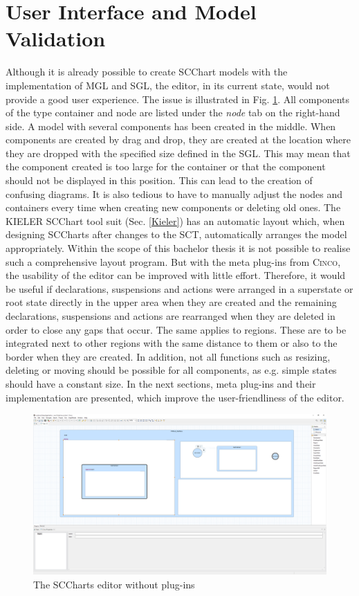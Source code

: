 \section{User Interface and Model Validation}
Although it is already possible to create SCChart models with the implementation of MGL and SGL, the editor, in its current state, would not provide a good user experience. The issue is illustrated in Fig. \ref{fig:Bad_User-Interface}. All components of the type container and node are listed under the \textit{node} tab on the right-hand side. A model with several components has been created in the middle. When components are created by drag and drop, they are created at the location where they are dropped with the specified size defined in the SGL. This may mean that the component created is too large for the container or that the component should not be displayed in this position. This can lead to the creation of confusing diagrams. It is also tedious to have to manually adjust the nodes and containers every time when creating new components or deleting old ones. The KIELER SCChart tool suit (Sec. \ref{Kieler}) has an automatic layout which, when designing SCCharts after changes to the SCT, automatically arranges the model appropriately. Within the scope of this bachelor thesis it is not possible to realise such a comprehensive layout program. But with the meta plug-ins from \textsc{Cinco}, the usability of the editor can be improved with little effort. Therefore, it would be useful if declarations, suspensions and actions were arranged in a superstate or root state directly in the upper area when they are created and the remaining declarations, suspensions and actions are rearranged when they are deleted in order to close any gaps that occur. The same applies to regions. These are to be integrated next to other regions with the same distance to them or also to the border when they are created. In addition, not all functions such as resizing, deleting or moving should be possible for all components, as e.g. simple states should have a constant size. In the next sections, meta plug-ins and their implementation are presented, which improve the user-friendliness of the editor.

\begin{figure}[h!]
\centering
\includegraphics[width=1.0\textwidth]{bilder/Bad_User-Interface.png}
\caption{The SCCharts editor without plug-ins}
\label{fig:Bad_User-Interface}
\end{figure} 

